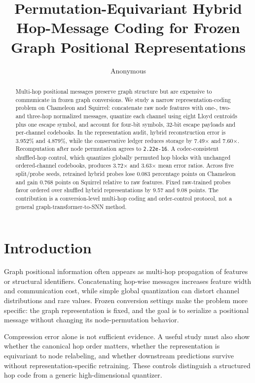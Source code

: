 \documentclass{article}
\title{Permutation-Equivariant Hybrid Hop-Message Coding for Frozen Graph Positional Representations}
\author{Anonymous}
\begin{document}
\begin{abstract}
Multi-hop positional messages preserve graph structure but are expensive to communicate in frozen graph conversions. We study a narrow representation-coding problem on Chameleon and Squirrel: concatenate raw node features with one-, two- and three-hop normalized messages, quantize each channel using eight Lloyd centroids plus one escape symbol, and account for four-bit symbols, 32-bit escape payloads and per-channel codebooks. In the representation audit, hybrid reconstruction error is 3.952\% and 4.879\%, while the conservative ledger reduces storage by 7.49$\times$ and 7.60$\times$. Recomputation after node permutation agrees to \texttt{2.22e-16}. A codec-consistent shuffled-hop control, which quantizes globally permuted hop blocks with unchanged ordered-channel codebooks, produces 3.72$\times$ and 3.63$\times$ mean error ratios. Across five split/probe seeds, retrained hybrid probes lose 0.083 percentage points on Chameleon and gain 0.768 points on Squirrel relative to raw features. Fixed raw-trained probes favor ordered over shuffled hybrid representations by 9.57 and 9.08 points. The contribution is a conversion-level multi-hop coding and order-control protocol, not a general graph-transformer-to-SNN method.
\end{abstract}

\maketitle

\section{Introduction}


Graph positional information often appears as multi-hop propagation of features or structural identifiers. Concatenating hop-wise messages increases feature width and communication cost, while simple global quantization can distort channel distributions and rare values. Frozen conversion settings make the problem more specific: the graph representation is fixed, and the goal is to serialize a positional message without changing its node-permutation behavior.

Compression error alone is not sufficient evidence. A useful study must also show whether the canonical hop order matters, whether the representation is equivariant to node relabeling, and whether downstream predictions survive without representation-specific retraining. These controls distinguish a structured hop code from a generic high-dimensional quantizer.
\end{document}
